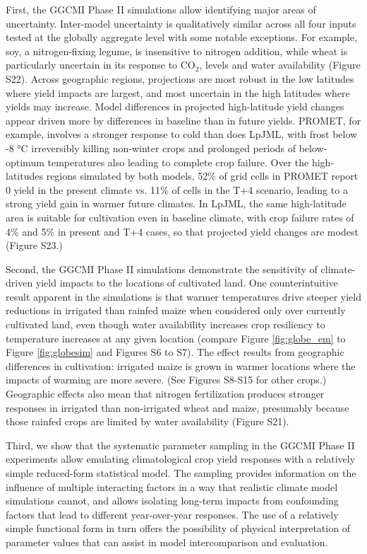 \documentclass[gmd, manuscript]{copernicus} %
\begin{document}
First, the GGCMI Phase II simulations allow identifying major areas of uncertainty. Inter-model uncertainty is qualitatively similar across all four inputs tested at the globally aggregate level with some notable exceptions. For example, soy, a nitrogen-fixing legume, is insensitive to nitrogen addition, while wheat is particularly uncertain in its response to CO$_2$, levels and water availability (Figure S22). Across geographic regions, projections are most robust in the low latitudes where yield impacts are largest, and most uncertain in the high latitudes where yields may increase. Model differences in projected high-latitude yield changes appear driven more by differences in baseline than in future yields.  PROMET, for example, involves a stronger response to cold than does LpJML, with frost below -8 °C irreversibly killing non-winter crops and prolonged periods of below-optimum temperatures also leading to complete crop failure. Over the high-latitudes regions simulated by both models, 52\% of grid cells in PROMET report 0 yield in the present climate vs. 11\% of cells in the T+4 scenario, leading to a strong yield gain in warmer future climates. In LpJML, the same high-latitude area is suitable for cultivation even in baseline climate, with crop failure rates of 4\% and 5\% in present and T+4 cases, so that projected yield changes are modest (Figure S23.)

Second, the GGCMI Phase II simulations demonstrate the sensitivity of climate-driven yield impacts to the locations of cultivated land. One counterintuitive result apparent in the simulations is that warmer temperatures drive steeper yield reductions in irrigated than rainfed maize when considered only over currently cultivated land, even though water availability increases crop resiliency to temperature increases at any given location (compare Figure \ref{fig:globe_em} to Figure \ref{fig:globesim} and Figures S6 to S7). The effect results from geographic differences in cultivation: irrigated maize is grown in warmer locations where the impacts of warming are more severe. (See Figures S8-S15 for other crops.) Geographic effects also mean that nitrogen fertilization produces stronger responses in irrigated than non-irrigated wheat and maize, presumably because those rainfed crops are limited by water availability (Figure S21).

Third, we show that the systematic parameter sampling in the GGCMI Phase II experiments allow emulating climatological crop yield responses with a relatively simple reduced-form statistical model. The sampling provides information on the influence of multiple interacting factors in a way that realistic climate model simulations cannot, and allows isolating long-term impacts from confounding factors that lead to different year-over-year responses. The use of a relatively simple functional form in turn offers the possibility of physical interpretation of parameter values that can assist in model intercomparison and evaluation. 
\end{document}
